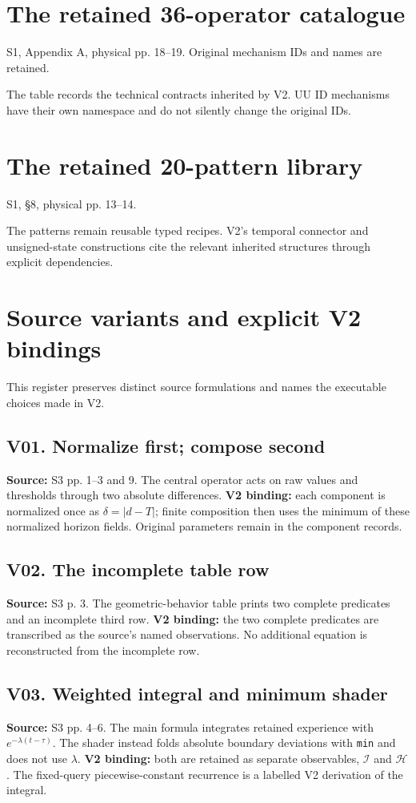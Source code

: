 \documentclass[11pt,a4paper]{article}
\numberwithin{equation}{section}
\newcommand{\newsec}[1]{\clearpage\section{#1}}
\newcommand{\origin}[1]{{\sffamily\small\color{slate}#1}\par\vspace{3pt}}
\begin{document}
\newsec{The retained 36-operator catalogue}
\label{app:operators}
\origin{S1, Appendix A, physical pp. 18--19. Original mechanism IDs and names are retained.}
The table records the technical contracts inherited by V2. UU ID mechanisms have their own namespace and do not silently change the original IDs.
{\small}

\newsec{The retained 20-pattern library}
\label{app:patterns}
\origin{S1, §8, physical pp. 13--14.}
The patterns remain reusable typed recipes. V2's temporal connector and unsigned-state constructions cite the relevant inherited structures through explicit dependencies.
{\small}

\newsec{Source variants and explicit V2 bindings}
\label{app:variants}
\origin{This register preserves distinct source formulations and names the executable choices made in V2.}

\subsection*{V01. Normalize first; compose second}
\textbf{Source:} S3 pp. 1--3 and 9. The central operator acts on raw values and thresholds through two absolute differences. \textbf{V2 binding:} each component is normalized once as $\delta=|d-T|$; finite composition then uses the minimum of these normalized horizon fields. Original parameters remain in the component records.

\subsection*{V02. The incomplete table row}
\textbf{Source:} S3 p. 3. The geometric-behavior table prints two complete predicates and an incomplete third row. \textbf{V2 binding:} the two complete predicates are transcribed as the source's named observations. No additional equation is reconstructed from the incomplete row.

\subsection*{V03. Weighted integral and minimum shader}
\textbf{Source:} S3 pp. 4--6. The main formula integrates retained experience with $e^{-\lambda(t-\tau)}$. The shader instead folds absolute boundary deviations with \texttt{min} and does not use $\lambda$. \textbf{V2 binding:} both are retained as separate observables, $\mathcal I$ and $\mathcal H$. The fixed-query piecewise-constant recurrence is a labelled V2 derivation of the integral.
\end{document}
